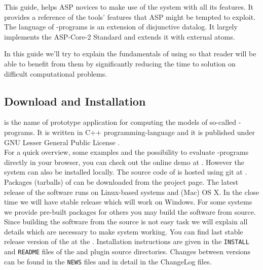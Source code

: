 \documentclass[14pt,a4paper, titlepage]{article}
\begin{document}
This guide, helps ASP novices to make use of the system with all its features. It provides a reference of the tools' features that ASP might be tempted to exploit. The language of \hex{}-programs is an extension of disjunctive datalog. It largely implements the ASP-Core-2 Standard \cite{ref} and extends it with external atoms. 

In this guide we'll try to explain the fundamentals of using \dlvhex{} so that reader will be able to benefit from them by significantly reducing the time to solution on difficult computational problems. 


\subsection{Download and Installation}
\dlvhex{} is the name of prototype application for computing the models of so-called \hex{}-programs. It is written in C++ programming-language and it is published under GNU Lesser General Public License \cite{licnc}.\bigskip \\For a quick overview, some examples and the possibility to evaluate \hex{}-programs directly in your browser, you can check out the online demo at \cite{onlinedemo}. However the system can also be installed locally. The source code of \dlvhex{}is hosted using git at \cite{git}. Packages (tarballs) of \dlvhex{} can be downloaded from the \cite{sourceforge} project page. The latest release of the software runs on Linux-based systems and (Mac) OS X. In the close time we will have stable release which will work on Windows. For some systems we provide pre-built packages \cite{prebuilt}  for others you may build the software from source. Since building the software from the source is not easy task we will explain all details which are necessary to make system working. You can find last stable release version of the \dlvhex{} at the \cite{sourceforge}. Installation instructions are given in the {\tt INSTALL} and {\tt README} files of the \dlvhex{} and plugin source directories. Changes between versions can be found in the {\tt NEWS} files and in detail in the ChangeLog files.
\end{document}
